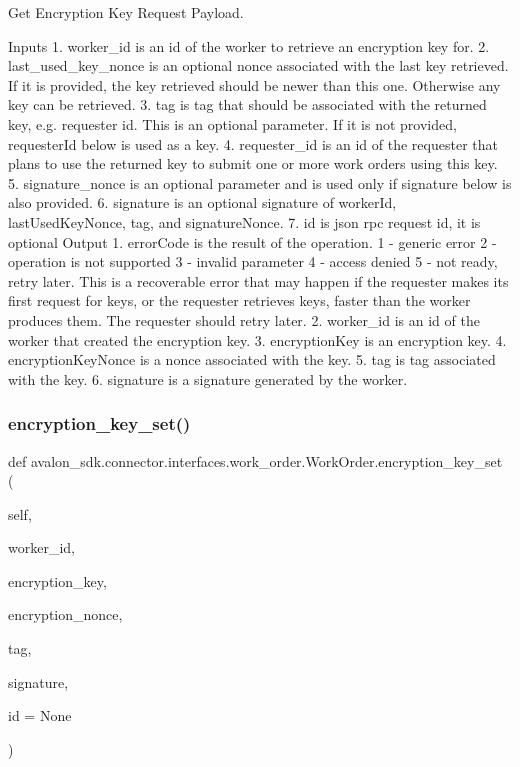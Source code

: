 \begin{DoxyVerb}Get Encryption Key Request Payload.

Inputs
1. worker_id is an id of the worker to retrieve an encryption key for.
2. last_used_key_nonce is an optional nonce associated with the
last key retrieved.
If it is provided, the key retrieved should be newer than this one.
Otherwise any key can be retrieved.
3. tag is tag that should be associated with the returned key,
e.g. requester id. This is an optional parameter. If it is not
provided, requesterId below is used as a key.
4. requester_id is an id of the requester that plans to use the
returned key to submit one or more work orders using this key.
5. signature_nonce is an optional parameter and is used only
if signature below is also provided.
6. signature is an optional signature of workerId,
lastUsedKeyNonce, tag, and signatureNonce.
7. id is json rpc request id, it is optional
Output
1. errorCode is the result of the operation.
   1 - generic error
   2 - operation is not supported
   3 - invalid parameter
   4 - access denied
   5 - not ready, retry later. This is a recoverable error that may
   happen if the requester makes its first request for keys,
   or the requester retrieves keys, faster than the worker
   produces them.
   The requester should retry later.
2. worker_id is an id of the worker that created the encryption key.
3. encryptionKey is an encryption key.
4. encryptionKeyNonce is a nonce associated with the key.
5. tag is tag associated with the key.
6. signature is a signature generated by the worker.
\end{DoxyVerb}
 \mbox{\label{classavalon__sdk_1_1connector_1_1interfaces_1_1work__order_1_1WorkOrder_a3a5014cbe6b89cce35d11fade8cb94b1}} 
\subsubsection{\texorpdfstring{encryption\+\_\+key\+\_\+set()}{encryption\_key\_set()}}
{\footnotesize\ttfamily def avalon\+\_\+sdk.\+connector.\+interfaces.\+work\+\_\+order.\+Work\+Order.\+encryption\+\_\+key\+\_\+set (\begin{DoxyParamCaption}\item[{}]{self,  }\item[{}]{worker\+\_\+id,  }\item[{}]{encryption\+\_\+key,  }\item[{}]{encryption\+\_\+nonce,  }\item[{}]{tag,  }\item[{}]{signature,  }\item[{}]{id = {\ttfamily None} }\end{DoxyParamCaption})}

